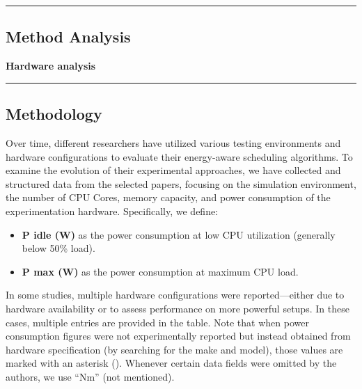 {\color{gray}\hrule}
\begin{center}
\section{Method Analysis}
\textbf{Hardware analysis}
\bigskip
\end{center}
{\color{gray}\hrule}

\begin{multicols}{2}
\subsection{Methodology}

Over time, different researchers have utilized various testing environments and hardware configurations to evaluate their energy-aware scheduling algorithms. To examine the evolution of their experimental approaches, we have collected and structured data from the selected papers, focusing on the simulation environment, the number of CPU Cores, memory capacity, and power consumption of the experimentation hardware. Specifically, we define:

\begin{itemize}
    \footnotesize
    \item \textbf{P idle (W)} as the power consumption at low CPU utilization (generally below 50\% load).
    \item \textbf{P max (W)} as the power consumption at maximum CPU load.
\end{itemize}

In some studies, multiple hardware configurations were reported—either due to hardware availability or to assess performance on more powerful setups. In these cases, multiple entries are provided in the table. Note that when power consumption figures were not experimentally reported but instead obtained from hardware specification (by searching for the make and model), those values are marked with an asterisk (\textasteriskcentered). Whenever certain data fields were omitted by the authors, we use ``Nm'' (not mentioned).

\end{multicols}

